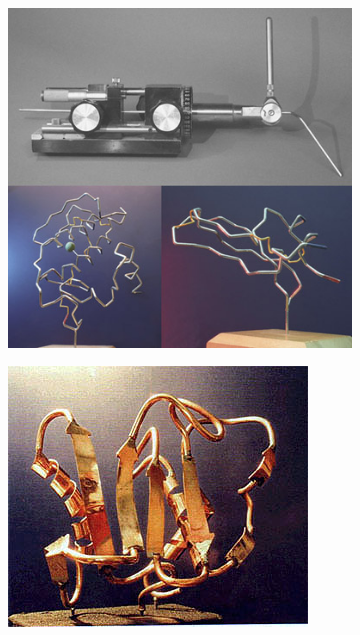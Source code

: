 \begin{figure}
  \begin{subfigure}{.5\textwidth}
  \centering
  {\includegraphics[width=0.9\linewidth]{./figures/ch1/bender_tool_models}}
    \label{Fig:bender_tool_models}
  \caption{}
  \end{subfigure}%
  \begin{subfigure}{.5\textwidth}
  \centering
  {\includegraphics[width=0.9\linewidth]{./figures/ch1/byron_sculpture_colagenase}}    

\end{subfigure}
\end{figure}
